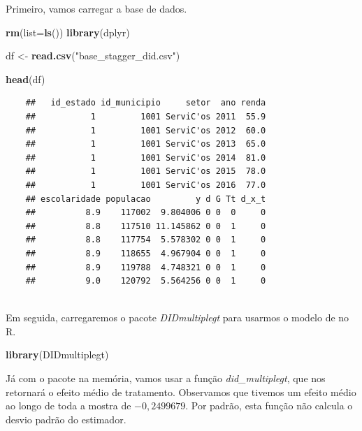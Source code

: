 \documentclass[portugues]{article}
\newenvironment{Shaded}{\begin{snugshade}}{\end{snugshade}}
\newcommand{\AttributeTok}[1]{\textcolor[rgb]{0.13,0.29,0.53}{#1}}
\newcommand{\FunctionTok}[1]{\textcolor[rgb]{0.13,0.29,0.53}{\textbf{#1}}}
\newcommand{\NormalTok}[1]{#1}
\newcommand{\OtherTok}[1]{\textcolor[rgb]{0.56,0.35,0.01}{#1}}
\newcommand{\StringTok}[1]{\textcolor[rgb]{0.31,0.60,0.02}{#1}}
\begin{document}
Primeiro, vamos carregar a base de dados.

\begin{box_code}

    \begin{Shaded}
    \begin{Highlighting}[]
    \FunctionTok{rm}\NormalTok{(}\AttributeTok{list=}\FunctionTok{ls}\NormalTok{())}
    \FunctionTok{library}\NormalTok{(dplyr)}
    
    \NormalTok{df }\OtherTok{\textless{}{-}} \FunctionTok{read.csv}\NormalTok{(}\StringTok{"base\_stagger\_did.csv"}\NormalTok{)}
    
    \FunctionTok{head}\NormalTok{(df)}
    \end{Highlighting}
    \end{Shaded}

    \begin{verbatim}
    ##   id_estado id_municipio     setor  ano renda 
    ##           1         1001 ServiC'os 2011  55.9          
    ##           1         1001 ServiC'os 2012  60.0         
    ##           1         1001 ServiC'os 2013  65.0          
    ##           1         1001 ServiC'os 2014  81.0 
    ##           1         1001 ServiC'os 2015  78.0
    ##           1         1001 ServiC'os 2016  77.0
    ## escolaridade populacao         y d G Tt d_x_t
    ##          8.9    117002  9.804006 0 0  0     0
    ##          8.8    117510 11.145862 0 0  1     0
    ##          8.8    117754  5.578302 0 0  1     0
    ##          8.9    118655  4.967904 0 0  1     0
    ##          8.9    119788  4.748321 0 0  1     0
    ##          9.0    120792  5.564256 0 0  1     0
    
    \end{verbatim}

\end{box_code}

Em seguida, carregaremos o pacote \textit{DIDmultiplegt} para usarmos o modelo de \cite{de2020two} no R. 
\begin{box_code}

    \begin{Shaded}
    \begin{Highlighting}[]
    \FunctionTok{library}\NormalTok{(DIDmultiplegt)}
    \end{Highlighting}
    \end{Shaded}

\end{box_code}

Já com o pacote na memória, vamos usar a função \textit{did\_multiplegt}, que nos retornará o efeito médio de tratamento. Observamos que tivemos um efeito médio ao longo de toda a mostra de $-0,2499679$. Por padrão, esta função não calcula o desvio padrão do estimador.
\end{document}
